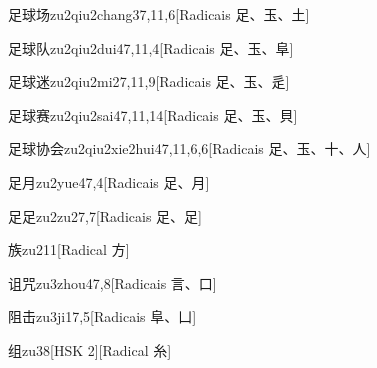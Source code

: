 \begin{entry}{足球场}{zu2qiu2chang3}{7,11,6}[Radicais ⾜、⽟、⼟]
\end{entry}

\begin{entry}{足球队}{zu2qiu2dui4}{7,11,4}[Radicais ⾜、⽟、⾩]
\end{entry}

\begin{entry}{足球迷}{zu2qiu2mi2}{7,11,9}[Radicais ⾜、⽟、⾡]
\end{entry}

\begin{entry}{足球赛}{zu2qiu2sai4}{7,11,14}[Radicais ⾜、⽟、⾙]
\end{entry}

\begin{entry}{足球协会}{zu2qiu2xie2hui4}{7,11,6,6}[Radicais ⾜、⽟、⼗、⼈]
\end{entry}

\begin{entry}{足月}{zu2yue4}{7,4}[Radicais ⾜、⽉]
\end{entry}

\begin{entry}{足足}{zu2zu2}{7,7}[Radicais ⾜、⾜]
\end{entry}

\begin{entry}{族}{zu2}{11}[Radical ⽅]
\end{entry}

\begin{entry}{诅咒}{zu3zhou4}{7,8}[Radicais ⾔、⼝]
\end{entry}

\begin{entry}{阻击}{zu3ji1}{7,5}[Radicais ⾩、⼐]
\end{entry}

\begin{entry}{组}{zu3}{8}[HSK 2][Radical ⽷]
\end{entry}

